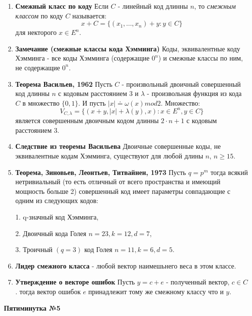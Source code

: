 \documentclass[a4paper, 12pt]{report}
\begin{document}
\begin{enumerate}
\item \textbf{Смежный класс по коду} Если $C$ - линейный код длинны $n$, то \textit{смежным классом} по коду $C$ называется: 
\[x + C = \lbrace (x_{1}, ..., x_{n}) + y : y\in C\rbrace\] 
для некторого $x \in E^{n}$.

\item \textbf{Замечание (смежные классы кода Хэмминга)} Коды, эквивалентные коду Хэмминга - все коды Хэмминга (содержащие $0^{n}$) и смежные классы по ним, не содержащие $0^{n}$. 

\item \textbf{Теорема Васильев, 1962} Пусть $C$ - произвольный двоичный совершенный код длинны $n$ с кодовым расстоянием $3$ и $\lambda$ - произвольная функция из кода $C$ в множество $\lbrace 0,1\rbrace$. И пусть $|x| \doteq \omega(x) mod 2$. Множество:
\[V_{C,\lambda} = \lbrace(x + y, |x| + \lambda(y), x): x\in E^{n}, y \in C\rbrace \]
является совершенным двоичным кодом длинны $2\cdot n + 1$ с кодовым расстоянием $3$.

\item \textbf{Следствие из теоремы Васильева} Двоичные совершенные коды, не эквивалентные кодам Хэмминга, существуют для любой длины $n$, $n\geq 15$.

\item \textbf{Теорема, Зиновьев, Леонтьев, Титвайнен, 1973}
Пусть $q = p^m$ тогда всякий  нетривиальный (то есть отличный от всего пространства и имеющий мощность больше 2) совершенный код имеет параметры совпадающие с одним из следующих кодов:

1. q-значный код Хэмминга,

2. Двоичный кода Голея $n = 23, k = 12, d = 7$,

3. Троичный $(q = 3)$ код Голея $n = 11, k = 6, d = 5$.

\item \textbf{Лидер смежного класса} - любой вектор наимешьнего веса в этом классе.

\item \textbf{Утверждение о векторе ошибок} Пусть $y = c + e$ - полученный вектор, $c\in C$. тогда вектор ошибок $e$ принадлежит тому же смежному классу что и $y$.

\end{enumerate}

\textbf{Пятиминутка №5}
\end{document}
